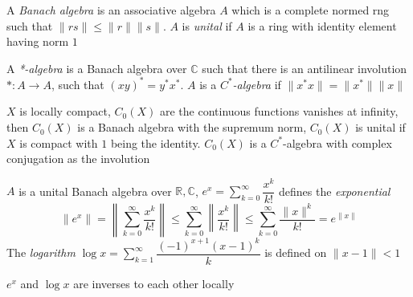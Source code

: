 \documentclass[main]{subfiles}
\begin{document}
\begin{definition}
A \textit{Banach algebra} is an associative algebra $A$ which is a complete normed rng such that $\|rs\|\leq\|r\|\|s\|$. $A$ is \textit{unital} if $A$ is a ring with identity element having norm $1$
\end{definition}

\begin{definition}
A \textit{*-algebra} is a Banach algebra over $\mathbb C$ such that there is an antilinear involution $*:A\to A$, such that $(xy)^*=y^*x^*$. $A$ is a $C^*$\textit{-algebra} if $\|x^*x\|=\|x^*\|\|x\|$
\end{definition}

\begin{example}
$X$ is locally compact, $C_0(X)$ are the continuous functions vanishes at infinity, then $C_0(X)$ is a Banach algebra with the supremum norm, $C_0(X)$ is unital if $X$ is compact with $1$ being the identity. $C_0(X)$ is a $C^*$-algebra with complex conjugation as the involution
\end{example}

\begin{definition}
$A$ is a unital Banach algebra over $\mathbb R,\mathbb C$, $e^x=\displaystyle\sum_{k=0}^\infty\dfrac{x^k}{k!}$ defines the \textit{exponential}
\[\|e^x\|=\left\|\sum_{k=0}^\infty\frac{x^k}{k!}\right\|\leq\sum_{k=0}^\infty\left\|\frac{x^k}{k!}\right\|\leq\sum_{k=0}^\infty\frac{\|x\|^k}{k!}=e^{\|x\|}\]
The \textit{logarithm} $\log x=\displaystyle\sum_{k=1}^\infty\dfrac{(-1)^{x+1}(x-1)^k}{k}$ is defined on $\|x-1\|<1$
\end{definition}

\begin{lemma}
$e^x$ and $\log x$ are inverses to each other locally
\end{lemma}
\end{document}
